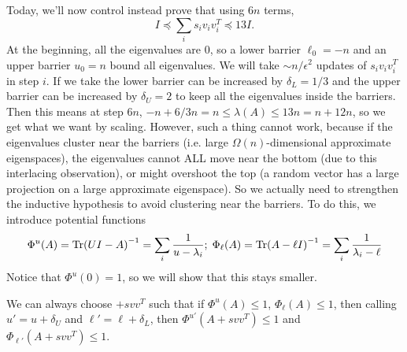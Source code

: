 Today, we'll now control instead prove that using $6n$ terms,
\[ I \preceq \sum_i s_i v_i v_i^T \preceq 13 I. \]
At the beginning, all the eigenvalues are $0$, so a lower barrier $\ell_0 = -n$
and an upper barrier $u_0 = n$ bound all eigenvalues.
We will take $\sim n/\epsilon^2$ updates
of $s_i v_i v_i^T$ in step $i$. If we take
the lower barrier can be increased by $\delta_L = 1/3$ and the upper barrier can be increased by $\delta_U = 2$
to keep all the eigenvalues inside the barriers. Then this means
at step $6n$, $-n + 6/3 n = n \le \lambda(A) \le 13n = n + 12n$,
so we get what we want by scaling. However, such a thing cannot work, 
because if the eigenvalues
cluster near the barriers (i.e. large $\Omega(n)$-dimensional approximate eigenspaces), 
the eigenvalues cannot ALL move near the bottom (due to this interlacing observation), or might overshoot the top
(a random vector has a large projection on a large approximate eigenspace).
So we actually need to strengthen the inductive hypothesis to avoid clustering near
the barriers. To do this, we introduce potential functions
\[ \Phi^{u}(A) = \Tr(UI - A)^{-1} = \sum_i \frac{1}{u - \lambda_i}; \; \Phi_{\ell}(A) = \Tr(A - \ell I)^{-1} = \sum_i \frac{1}{\lambda_i - \ell} \]
Notice that $\Phi^u(0) = 1$, so we will show that this stays smaller.
\begin{lemma}
    We can always choose $+ s vv^T$ such that if $\Phi^u(A) \le 1$, $\Phi_{\ell}(A) \le 1$,
    then calling $u' = u +\delta_U$ and $\ell' = \ell + \delta_{L}$,
    then $\Phi^{u'}(A + svv^T) \le 1$ and $\Phi_{\ell'}(A + svv^T) \le 1$.
\end{lemma}


